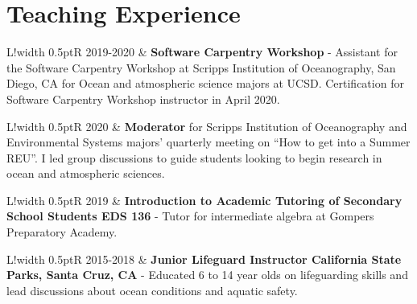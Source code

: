 \documentclass[10pt]{article}
\newcommand\VRule{\color{lightgray}\vrule width 0.5pt}
\begin{document}
\section*{Teaching Experience}
\vspace{.3cm}
\begin{tabular}{L!{\VRule}R}
2019-2020 & \textbf{Software Carpentry Workshop} - Assistant for the Software Carpentry Workshop at Scripps Institution of Oceanography, San Diego, CA for Ocean and atmospheric science majors at UCSD. Certification for Software Carpentry Workshop instructor in April 2020. \\[5pt]
\end{tabular}
\newline \noindent
\newline \noindent 
\newline \noindent
\begin{tabular}{L!{\VRule}R}
2020 & \textbf{Moderator} for Scripps Institution of Oceanography and Environmental Systems majors’ quarterly meeting on ``How to get into a Summer REU''. I led group discussions to guide students looking to begin research in ocean and atmospheric sciences. \\[5pt]
\end{tabular}
\newline \noindent
\newline \noindent 
\newline \noindent
\begin{tabular}{L!{\VRule}R}
2019 & \textbf{Introduction to Academic Tutoring of Secondary School Students EDS 136} - Tutor for intermediate algebra at Gompers Preparatory Academy. \\[5pt]
\end{tabular}
\newline \noindent
\newline \noindent 
\newline \noindent
\begin{tabular}{L!{\VRule}R}
2015-2018 & \textbf{Junior Lifeguard Instructor California State Parks, Santa Cruz, CA } - Educated 6 to 14 year olds on lifeguarding skills and lead discussions about ocean conditions and aquatic safety. \\[5pt]
\end{tabular}
\end{document}
